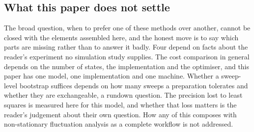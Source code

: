 
\subsection*{What this paper does not settle}

The broad question, when to prefer one of these methods over another, cannot be closed with the
elements assembled here, and the honest move is to say which parts are missing rather than to answer
it badly. Four depend on facts about the reader's experiment no simulation study supplies. The
cost comparison in general depends on the number of states, the implementation and the optimiser, and
this paper has one model, one implementation and one machine. Whether a sweep-level bootstrap
suffices depends on how many sweeps a preparation tolerates and whether they are exchangeable, a
rundown question. The precision lost to least squares is measured here for this model, and whether
that loss matters is the reader's judgement about their own question. How any of this composes with
non-stationary fluctuation analysis as a complete workflow is not addressed.


